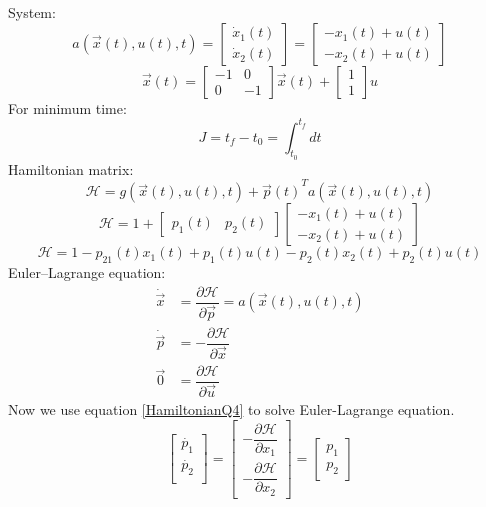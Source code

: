 System:
\begin{equation}
	a(\vec x(t), u(t), t) = 
	\begin{bmatrix}
		\dot x_1(t) \\
		\dot x_2(t)
	\end{bmatrix}
= 
	\begin{bmatrix}
	-x_1(t) + u(t) \\
	-x_2(t) + u(t)
	\end{bmatrix}
\end{equation}
\begin{equation}
	\vec{x}(t) = 
	\begin{bmatrix}
		-1 &  0 \\
		 0 & -1
	\end{bmatrix}
\vec{x}(t)+
\begin{bmatrix}
		1 \\
		1
	\end{bmatrix}u
\end{equation}
For minimum time:
$$J = t_f - t_0 = \int_{t_0}^{t_f} dt$$
Hamiltonian matrix:
$$\mathcal{H} =  g(\vec x(t), u(t), t) + {\vec{p}(t)}^Ta(\vec x(t), u(t), t)$$
$$\mathcal{H} = 1 + \begin{bmatrix} 
	p_1(t) & p_2(t)
\end{bmatrix} 	\begin{bmatrix}
-x_1(t) + u(t) \\
-x_2(t) + u(t)
\end{bmatrix}$$
\begin{equation}\label{HamiltonianQ4}
	\mathcal{H} = 1 - p_21(t)x_1(t) + p_1(t)u(t) - p_2(t)x_2(t) +p_2(t)u(t) 
\end{equation}
Euler–Lagrange equation:
\begin{align}
	\dot{\vec{x}} &= \dfrac{\partial \mathcal{H} }{\partial \vec{p}} = a(\vec x(t), u(t), t)\\
	\dot{\vec{p}} &= -\dfrac{\partial \mathcal{H} }{\partial \vec{x}} \\
	{\vec{0}} &= \dfrac{\partial \mathcal{H} }{\partial \vec{u}}
\end{align}
Now  we use equation \ref{HamiltonianQ4} to solve Euler-Lagrange equation.
\begin{equation}\label{diffpQ4}
	\begin{bmatrix}
		\dot{p_1}\\
		\dot{p_2}\\
	\end{bmatrix} = \begin{bmatrix}
		-\dfrac{\partial \mathcal{H}}{\partial x_1} \\[10 pt]
		-\dfrac{\partial \mathcal{H}}{\partial x_2}
	\end{bmatrix} = \begin{bmatrix}
	p_1\\
	p_2
	\end{bmatrix}
\end{equation} 
